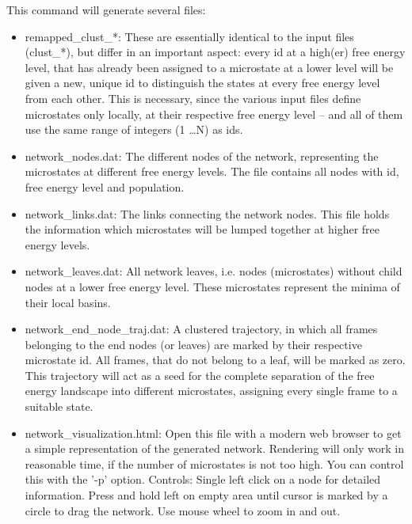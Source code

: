 \documentclass[12pt,a4paper,twoside,english,fleqn]{article}
\begin{document}
This command will generate several files:
\begin{itemize}
  \item remapped\_clust\_*: These are essentially identical to the input files (clust\_*), but
                            differ in an important aspect: every id at a high(er) free energy level,
                            that has already been assigned to a microstate at a lower level will be given
                            a new, unique id to distinguish the states at every free energy level from each other.
                            This is necessary, since the various input files define microstates only locally,
                            at their respective free energy level -- and all of them use the same range of integers
                            (1 \dots N) as ids.
  \item network\_nodes.dat: The different nodes of the network, representing the microstates at different free energy levels.
                            The file contains all nodes with id, free energy level and population.
  \item network\_links.dat: The links connecting the network nodes. This file holds the information which microstates
                            will be lumped together at higher free energy levels.
  \item network\_leaves.dat: All network leaves, i.e. nodes (microstates) without child nodes at a lower free energy level. 
                             These microstates represent the minima of their local basins.
  \item network\_end\_node\_traj.dat: A clustered trajectory, in which all frames belonging to the end nodes (or leaves)
                                      are marked by their respective microstate id.
                                      All frames, that do not belong to a leaf, will be marked as zero.
                                      This trajectory will act as a seed for the complete separation of the free energy landscape into
                                      different microstates, assigning every single frame to a suitable state.
  \item network\_visualization.html: Open this file with a modern web browser to get a simple representation of the generated network.
                                     Rendering will only work in reasonable time, if the number of microstates is not too high.
                                     You can control this with the '-p' option.
                                     Controls: Single left click on a node for detailed information.
                                     Press and hold left on empty area until cursor is marked by a circle to drag the network.
                                     Use mouse wheel to zoom in and out.
\end{itemize}
\end{document}
